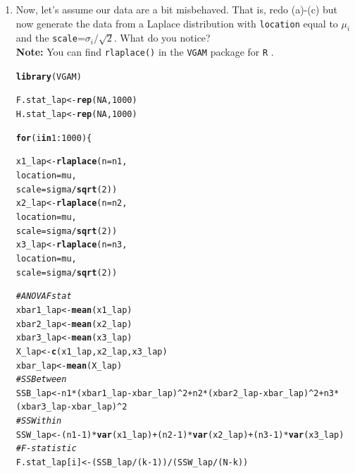 \documentclass{article}\usepackage[]{graphicx}\usepackage[]{xcolor}
\makeatletter
\newcommand{\hlnum}[1]{\textcolor[rgb]{0.686,0.059,0.569}{#1}}%
\newcommand{\hlcom}[1]{\textcolor[rgb]{0.678,0.584,0.686}{\textit{#1}}}%
\newcommand{\hlopt}[1]{\textcolor[rgb]{0,0,0}{#1}}%
\newcommand{\hldef}[1]{\textcolor[rgb]{0.345,0.345,0.345}{#1}}%
\newcommand{\hlkwa}[1]{\textcolor[rgb]{0.161,0.373,0.58}{\textbf{#1}}}%
\newcommand{\hlkwb}[1]{\textcolor[rgb]{0.69,0.353,0.396}{#1}}%
\newcommand{\hlkwc}[1]{\textcolor[rgb]{0.333,0.667,0.333}{#1}}%
\newcommand{\hlkwd}[1]{\textcolor[rgb]{0.737,0.353,0.396}{\textbf{#1}}}%
\newenvironment{kframe}{%
 \def\at@end@of@kframe{}%
 \ifinner\ifhmode%
  \def\at@end@of@kframe{\end{minipage}}%
  \begin{minipage}{\columnwidth}%
 \fi\fi%
 \def\FrameCommand##1{\hskip\@totalleftmargin \hskip-\fboxsep
 \colorbox{shadecolor}{##1}\hskip-\fboxsep
     \hskip-\linewidth \hskip-\@totalleftmargin \hskip\columnwidth}%
 \MakeFramed {\advance\hsize-\width
   \@totalleftmargin\z@ \linewidth\hsize
   \@setminipage}}%
 {\par\unskip\endMakeFramed%
 \at@end@of@kframe}
\newenvironment{knitrout}{}{} %
\makeatother
\begin{document}
\begin{enumerate}
\begin{enumerate}
\item Now, let's assume our data are a bit misbehaved. That is, redo
(a)-(c) but now generate the data from a Laplace distribution with
\texttt{location} equal to $\mu_i$ and the \texttt{scale}=$\sigma_i/\sqrt{2}$.
What do you notice?\\
\textbf{Note:} You can find \texttt{rlaplace()} in the \texttt{VGAM}
package for \texttt{R} \cite{VGAM}.

\begin{knitrout}\scriptsize
{}\color{fgcolor}\begin{kframe}
\begin{alltt}
\hlkwd{library}\hldef{(VGAM)}

\hldef{F.stat_lap} \hlkwb{<-} \hlkwd{rep}\hldef{(}\hlnum{NA}\hldef{,} \hlnum{1000}\hldef{)}
\hldef{H.stat_lap} \hlkwb{<-} \hlkwd{rep}\hldef{(}\hlnum{NA}\hldef{,} \hlnum{1000}\hldef{)}

\hlkwa{for} \hldef{(i} \hlkwa{in} \hlnum{1}\hlopt{:}\hlnum{1000}\hldef{)\{}

\hldef{x1_lap} \hlkwb{<-} \hlkwd{rlaplace}\hldef{(}\hlkwc{n} \hldef{= n1,}
                   \hlkwc{location} \hldef{= mu,}
                   \hlkwc{scale} \hldef{= sigma}\hlopt{/}\hlkwd{sqrt}\hldef{(}\hlnum{2}\hldef{))}
\hldef{x2_lap} \hlkwb{<-} \hlkwd{rlaplace}\hldef{(}\hlkwc{n} \hldef{= n2,}
                   \hlkwc{location} \hldef{= mu,}
                   \hlkwc{scale} \hldef{= sigma}\hlopt{/}\hlkwd{sqrt}\hldef{(}\hlnum{2}\hldef{))}
\hldef{x3_lap} \hlkwb{<-} \hlkwd{rlaplace}\hldef{(}\hlkwc{n} \hldef{= n3,}
                   \hlkwc{location} \hldef{= mu,}
                   \hlkwc{scale} \hldef{= sigma}\hlopt{/}\hlkwd{sqrt}\hldef{(}\hlnum{2}\hldef{))}

  \hlcom{# ANOVA F stat}
  \hldef{xbar1_lap} \hlkwb{<-} \hlkwd{mean}\hldef{(x1_lap)}
  \hldef{xbar2_lap} \hlkwb{<-} \hlkwd{mean}\hldef{(x2_lap)}
  \hldef{xbar3_lap} \hlkwb{<-} \hlkwd{mean}\hldef{(x3_lap)}
  \hldef{X_lap} \hlkwb{<-} \hlkwd{c}\hldef{(x1_lap, x2_lap, x3_lap)}
  \hldef{xbar_lap} \hlkwb{<-} \hlkwd{mean}\hldef{(X_lap)}
  \hlcom{# SSBetween}
  \hldef{SSB_lap} \hlkwb{<-} \hldef{n1}\hlopt{*}\hldef{(xbar1_lap}\hlopt{-}\hldef{xbar_lap)}\hlopt{^}\hlnum{2} \hlopt{+} \hldef{n2}\hlopt{*}\hldef{(xbar2_lap}\hlopt{-}\hldef{xbar_lap)}\hlopt{^}\hlnum{2} \hlopt{+} \hldef{n3}\hlopt{*}\hldef{(xbar3_lap}\hlopt{-}\hldef{xbar_lap)}\hlopt{^}\hlnum{2}
  \hlcom{# SSWithin}
  \hldef{SSW_lap} \hlkwb{<-} \hldef{(n1}\hlopt{-}\hlnum{1}\hldef{)}\hlopt{*}\hlkwd{var}\hldef{(x1_lap)} \hlopt{+} \hldef{(n2}\hlopt{-}\hlnum{1}\hldef{)}\hlopt{*}\hlkwd{var}\hldef{(x2_lap)} \hlopt{+} \hldef{(n3}\hlopt{-}\hlnum{1}\hldef{)}\hlopt{*}\hlkwd{var}\hldef{(x3_lap)}
  \hlcom{# F-statistic}
  \hldef{F.stat_lap[i]} \hlkwb{<-} \hldef{(SSB_lap}\hlopt{/}\hldef{(k}\hlopt{-}\hlnum{1}\hldef{))}\hlopt{/}\hldef{(SSW_lap}\hlopt{/}\hldef{(N}\hlopt{-}\hldef{k))}


\end{alltt}
\end{kframe}
\end{knitrout}
\end{enumerate}
\end{enumerate}
\end{document}
